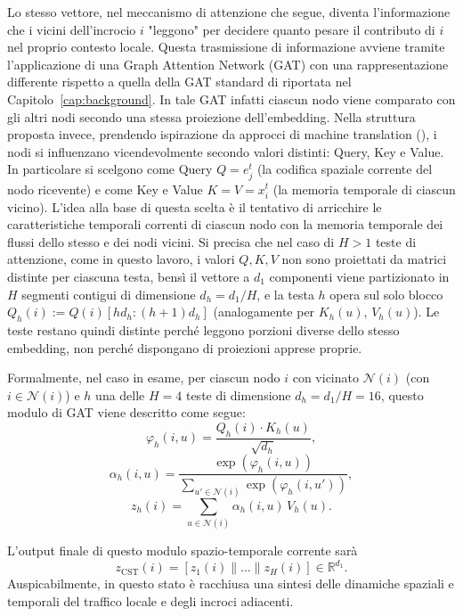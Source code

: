 Lo stesso vettore, nel meccanismo di attenzione che segue, diventa l'informazione che i vicini dell'incrocio $i$ "leggono"
per decidere quanto pesare il contributo di $i$ nel proprio contesto locale. Questa trasmissione di informazione avviene
tramite l'applicazione di una Graph Attention Network (GAT) con una rappresentazione differente rispetto a
quella della GAT standard di \citet{velickovic2018gat} riportata nel Capitolo~\ref{cap:background}.
In tale GAT infatti ciascun nodo viene comparato con gli altri nodi secondo una stessa proiezione dell'embedding.
Nella struttura proposta invece, prendendo ispirazione da approcci di machine translation (\cite{vaswani2017attention}), i nodi si influenzano vicendevolmente secondo valori distinti: Query, Key e Value.
In particolare si scelgono come Query $Q=e_j^t$ (la codifica spaziale corrente del nodo ricevente) e come Key e Value $K=V=x_i^t$ (la memoria temporale di ciascun vicino).
L'idea alla base di questa scelta è il tentativo di arricchire le caratteristiche temporali correnti di ciascun nodo con la memoria temporale dei flussi dello stesso e dei nodi vicini.
Si precisa che nel caso di $H>1$ teste di attenzione, come in questo lavoro, i valori $Q,K,V$ non sono proiettati da matrici distinte per ciascuna testa, bensì
il vettore a $d_1$ componenti viene partizionato in $H$ segmenti contigui di dimensione $d_h = d_1/H$, e la testa $h$ opera sul solo blocco $Q_h(i) := Q(i)[h d_h : (h{+}1)d_h]$ (analogamente per $K_h(u)$, $V_h(u)$).
Le teste restano quindi distinte perché leggono porzioni diverse dello stesso embedding, non perché dispongano di proiezioni apprese proprie.

Formalmente, nel caso in esame, per ciascun nodo $i$ con vicinato $\mathcal{N}(i)$ (con $i\in \mathcal{N}(i)$) e $h$ una delle $H=4$ teste di dimensione $d_h = d_1/H = 16$, questo modulo di GAT viene descritto come segue:
\begin{equation}
  \varphi_h(i,u) = \frac{Q_h(i) \cdot K_h(u)}{\sqrt{d_h}} ,
  \label{eq:stgat-attn}
\end{equation}
\[ \alpha_h(i,u) = \frac{\exp(\varphi_h(i,u))}{\sum_{u' \in \mathcal{N}(i)} \exp(\varphi_h(i,u'))}, \]
\[ z_h(i) = \sum_{u \in \mathcal{N}(i)} \alpha_h(i,u)\, V_h(u) .\]

L'output finale di questo modulo spazio-temporale corrente sarà
\[ z_{\mathrm{CST}}(i) = [z_1(i) \| \dots \| z_H(i)] \in \mathbb{R}^{d_1}. \]
Auspicabilmente, in questo stato è racchiusa una sintesi delle dinamiche spaziali e temporali del traffico locale e degli incroci adiacenti.


